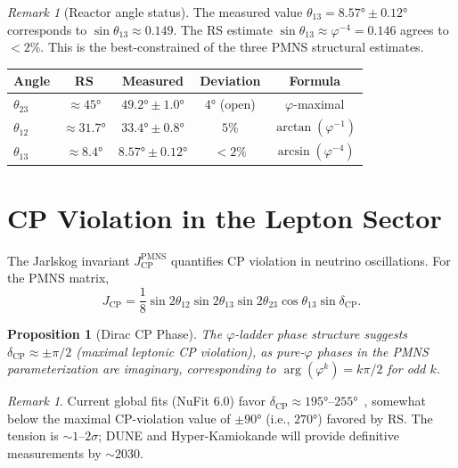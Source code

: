 \documentclass[12pt,a4paper]{article}
\newtheorem{proposition}[theorem]{Proposition}
\theoremstyle{definition}
\theoremstyle{remark}
\newtheorem{remark}[theorem]{Remark}
\begin{document}
\begin{remark}[Reactor angle status]
The measured value $\theta_{13} = 8.57° \pm 0.12°$~\cite{PDG2024}
corresponds to $\sin\theta_{13} \approx 0.149$.  The RS estimate
$\sin\theta_{13} \approx \varphi^{-4} = 0.146$ agrees to $<2\%$.
This is the best-constrained of the three PMNS structural estimates.
\end{remark}

\begin{center}
\renewcommand{\arraystretch}{1.3}
\begin{tabular}{lcccc}
\toprule
\textbf{Angle} & \textbf{RS} & \textbf{Measured} & \textbf{Deviation} & \textbf{Formula} \\
\midrule
$\theta_{23}$ & $\approx 45°$ & $49.2° \pm 1.0°$ & $4°$ (open) & $\varphi$-maximal \\
$\theta_{12}$ & $\approx 31.7°$ & $33.4° \pm 0.8°$ & $5\%$ & $\arctan(\varphi^{-1})$ \\
$\theta_{13}$ & $\approx 8.4°$ & $8.57° \pm 0.12°$ & $<2\%$ & $\arcsin(\varphi^{-4})$ \\
\bottomrule
\end{tabular}
\end{center}

\section{CP Violation in the Lepton Sector}
\label{sec:cp}

The Jarlskog invariant $J_{\mathrm{CP}}^{\mathrm{PMNS}}$ quantifies
CP violation in neutrino oscillations.  For the PMNS matrix,
\begin{equation}
  J_{\mathrm{CP}} = \frac{1}{8} \sin 2\theta_{12} \sin 2\theta_{13}
  \sin 2\theta_{23} \cos\theta_{13} \sin\delta_{\mathrm{CP}}.
\end{equation}

\begin{proposition}[Dirac CP Phase]
\label{prop:deltaCP}
The $\varphi$-ladder phase structure suggests
$\delta_{\mathrm{CP}} \approx \pm \pi/2$ (maximal leptonic CP violation),
as pure-$\varphi$ phases in the PMNS parameterization are imaginary,
corresponding to $\arg(\varphi^k) = k\pi/2$ for odd $k$.
\end{proposition}

\begin{remark}
Current global fits (NuFit 6.0) favor
$\delta_{\mathrm{CP}} \approx 195°$--$255°$~\cite{PDG2024},
somewhat below the maximal CP-violation value of $\pm 90°$ (i.e.,
$270°$) favored by RS.  The tension is $\sim 1$--$2\sigma$; DUNE and
Hyper-Kamiokande will provide definitive measurements by $\sim 2030$.
\end{remark}
\end{document}
